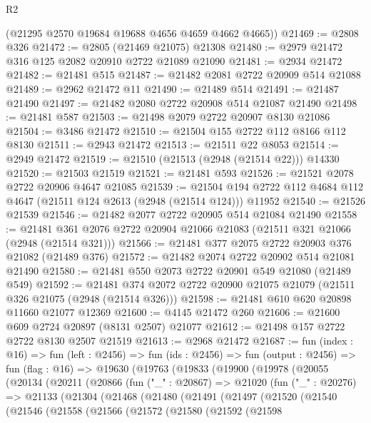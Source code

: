\begin{lexlean}{R2}
\begin{coremodule}
      (@21295 @2570 @19684 @19688 @4656 @4659 @4662 @4665))
@21469 := @2808 @326
@21472 := @2805 (@21469 @21075) @21308
@21480 := @2979 @21472 @316 @125 @2082 @20910 @2722 @21089 @21090
@21481 := @2934 @21472
@21482 := @21481 @515
@21487 := @21482 @2081 @2722 @20909 @514 @21088
@21489 := @2962 @21472 @11
@21490 := @21489 @514
@21491 := @21487 @21490
@21497 := @21482 @2080 @2722 @20908 @514 @21087 @21490
@21498 := @21481 @587
@21503 := @21498 @2079 @2722 @20907 @8130 @21086
@21504 := @3486 @21472
@21510 := @21504 @155 @2722 @112 @8166 @112 @8130
@21511 := @2943 @21472
@21513 := @21511 @22 @8053
@21514 := @2949 @21472
@21519 := @21510 (@21513 (@2948 (@21514 @22))) @14330
@21520 := @21503 @21519
@21521 := @21481 @593
@21526 := @21521 @2078 @2722 @20906 @4647 @21085
@21539 := @21504 @194 @2722 @112 @4684 @112 @4647 (@21511 @124 @2613 (@2948 (@21514 @124))) @11952
@21540 := @21526 @21539
@21546 := @21482 @2077 @2722 @20905 @514 @21084 @21490
@21558 := @21481 @361 @2076 @2722 @20904 @21066 @21083 (@21511 @321 @21066 (@2948 (@21514 @321)))
@21566 := @21481 @377 @2075 @2722 @20903 @376 @21082 (@21489 @376)
@21572 := @21482 @2074 @2722 @20902 @514 @21081 @21490
@21580 := @21481 @550 @2073 @2722 @20901 @549 @21080 (@21489 @549)
@21592 := @21481 @374 @2072 @2722 @20900 @21075 @21079 (@21511 @326 @21075 (@2948 (@21514 @326)))
@21598 := @21481 @610 @620 @20898 @11660 @21077 @12369
@21600 := @4145 @21472 @260
@21606 := @21600 @609 @2724 @20897 (@8131 @2507) @21077
@21612 := @21498 @157 @2722 @2722 @8130 @2507 @21519
@21613 := @2968 @21472
@21687 := fun (index : @16) =>
  fun (left : @2456) =>
  fun (ids : @2456) =>
  fun (output : @2456) =>
  fun (flag : @16) =>
  @19630
    (@19763
      (@19833
        (@19900
          (@19978
            (@20055
              (@20134
                (@20211
                  (@20866
                    (fun ("_" : @20867) =>
                    @21020
                      (fun ("_" : @20276) =>
                      @21133
                        (@21304
                          (@21468
                            (@21480
                              (@21491
                                (@21497
                                  (@21520
                                    (@21540
                                      (@21546
                                        (@21558
                                          (@21566
                                            (@21572
                                              (@21580
                                                (@21592
                                                  (@21598

\end{coremodule}
\end{lexlean}
